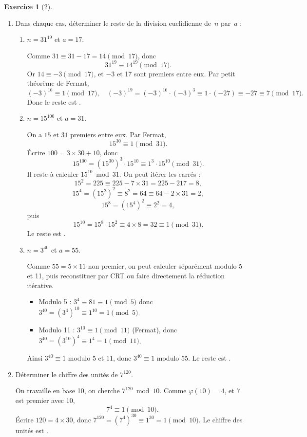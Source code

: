 \documentclass{article}
\theoremstyle{definition}
\newtheorem{exercice}{Exercice}
\begin{document}
\begin{exercice}[2]
\begin{enumerate}
 \item Dans chaque cas, déterminer le reste de la division euclidienne de~$n$ par~$a$ :
 \begin{enumerate}
  \item $n=31^{19}$ et $a=17$.

  Comme $31\equiv31-17=14\pmod{17}$, donc
  \[31^{19}\equiv14^{19}\pmod{17}.\]
  Or $14\equiv-3\pmod{17}$, et $-3$ et 17 sont premiers entre eux. Par petit théorème de Fermat,
  \[(-3)^{16}\equiv1\pmod{17},\quad(-3)^{19}=(-3)^{16}\cdot(-3)^3\equiv1\cdot(-27)\equiv-27\equiv7\pmod{17}.\]
  Donc le reste est .

  \item $n=15^{100}$ et $a=31$.

  On a $15$ et $31$ premiers entre eux. Par Fermat,
  \[15^{30}\equiv1\pmod{31}.\]
  Écrire $100=3\times30+10$, donc
  \[15^{100}=(15^{30})^3\cdot15^{10}\equiv1^3\cdot15^{10}\pmod{31}.\]
  Il reste à calculer $15^{10}\bmod31$. On peut itérer les carrés :
  \[15^2=225\equiv225-7\times31=225-217=8,\]
  \[15^4=(15^2)^2\equiv8^2=64\equiv64-2\times31=2,\]
  \[15^8=(15^4)^2\equiv2^2=4,\]
  puis
  \[15^{10}=15^8\cdot15^2\equiv4\times8=32\equiv1\pmod{31}.\]
  Le reste est .

  \item $n=3^{40}$ et $a=55$.

  Comme $55=5\times11$ non premier, on peut calculer séparément modulo 5 et 11, puis reconstituer par CRT ou faire directement la réduction itérative.
  \begin{itemize}
    \item Modulo 5 : $3^4\equiv81\equiv1\pmod5$ donc $3^{40}=(3^4)^{10}\equiv1^{10}=1\pmod5$.
    \item Modulo 11 : $3^{10}\equiv1\pmod{11}$ (Fermat), donc $3^{40}=(3^{10})^4\equiv1^4=1\pmod{11}$.
  \end{itemize}
  Ainsi $3^{40}\equiv1$ modulo 5 et 11, donc $3^{40}\equiv1$ modulo 55. Le reste est .
 \end{enumerate}

 \item Déterminer le chiffre des unités de $7^{120}$.

 On travaille en base 10, on cherche $7^{120}\bmod10$. Comme $\varphi(10)=4$, et $7$ est premier avec 10,
 \[7^4\equiv1\pmod{10}.\]
 Écrire $120=4\times30$, donc $7^{120}=(7^4)^{30}\equiv1^{30}=1\pmod{10}$. Le chiffre des unités est .
\end{enumerate}
\end{exercice}
\end{document}
